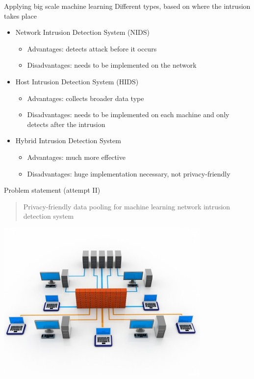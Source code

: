 \documentclass[11pt,t]{beamer}
\begin{document}
\begin{frame}{Applying big scale machine learning}
Different types, based on where the intrusion takes place
\begin{itemize}
    \item Network Intrusion Detection System (NIDS)
    \begin{itemize}
        \item Advantages: detects attack before it occurs
        \item Disadvantages: needs to be implemented on the network
    \end{itemize}
    \item Host Intrusion Detection System (HIDS)
    \begin{itemize}
        \item Advantages: collects broader data type
        \item Disadvantages: needs to be implemented on each machine and only detects after the intrusion
    \end{itemize}
    \item Hybrid Intrusion Detection System
    \begin{itemize}
        \item Advantages: much more effective
        \item Disadvantages: huge implementation necessary, not privacy-friendly
    \end{itemize}
\end{itemize}
\end{frame}
\begin{frame}[plain,c]{Problem statement (attempt II)}
\begin{center}
    \begin{quote}
    Privacy-friendly data pooling for machine learning network intrusion detection system
\end{quote}
\includegraphics[width=.6\textwidth]{nids}
\end{center}
\end{frame}
\end{document}
